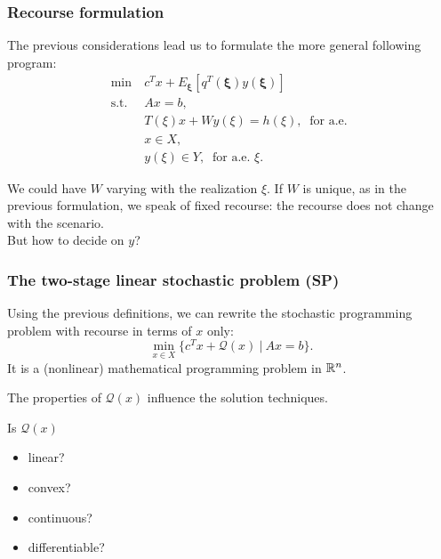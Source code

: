 \documentclass{beamer}
\def\bxi{\boldsymbol\xi}
\def\bxi{\boldsymbol\xi}
\begin{document}
\begin{frame}
	\frametitle{Recourse formulation}
	
	The previous considerations lead us to formulate the more general following program:
	\begin{align*}
	\min\ & c^Tx+E_{\bxi}[q^T(\bxi)y(\bxi)] \\
	\mbox{s.t. } & Ax = b, \\
	& T(\xi)x + Wy(\xi) = h(\xi),\ \text{ for a.e. } \\
	& x \in X, \\
	& y(\xi) \in Y,\ \text{ for a.e. } \xi.
	\end{align*}
	
	We could have $W$ varying with the realization $\xi$.
	If $W$ is unique, as in the previous formulation, we speak of {\red fixed recourse}: the recourse does not change with the scenario.\\
	But how to decide on $y$?
	
\end{frame}

\begin{frame}
	\frametitle{The two-stage linear stochastic problem (SP)}
	
	Using the previous definitions, we can rewrite the stochastic programming problem with recourse in terms of $x$ only:
	\[
	\min_{x \in X} \lbrace c^T x + \mathcal{Q}(x) \ |\  Ax = b \rbrace.
	\]
	It is a (nonlinear) mathematical programming problem in ${\mathbb{R}}^n$.
	
	The properties of $\mathcal{Q}(x)$ influence the solution techniques.
	
	\mbox{}
	
	Is $\mathcal{Q}(x)$
	\begin{itemize}
		\item
		linear?
		\item
		convex?
		\item
		continuous?
		\item
		differentiable?
	\end{itemize}
	
\end{frame}
\end{document}
